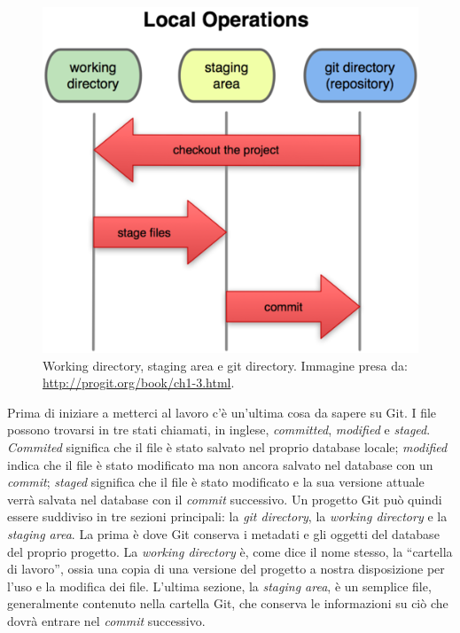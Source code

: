 \documentclass[a4paper,12pt,oneside]{article}
\begin{document}
\begin{figure}
  \centering
  \includegraphics{18333fig0106-tn}
  \caption{Working directory, staging area e git directory. Immagine presa da:
    \url{http://progit.org/book/ch1-3.html}.}
\end{figure}
Prima di iniziare a metterci al lavoro c'è un'ultima cosa da sapere su Git. I
file possono trovarsi in tre stati chiamati, in inglese, \emph{committed},
\emph{modified} e \emph{staged}. \emph{Commited} significa che il file è stato
salvato nel proprio database locale; \emph{modified} indica che il file è stato
modificato ma non ancora salvato nel database con un \emph{commit};
\emph{staged} significa che il file è stato modificato e la sua versione attuale
verrà salvata nel database con il \emph{commit} successivo.
Un progetto Git può quindi essere suddiviso in tre sezioni principali: la
\emph{git directory}, la \emph{working directory} e la \emph{staging area}. La
prima è dove Git conserva i metadati e gli oggetti del database del proprio
progetto. La \emph{working directory} è, come dice il nome stesso, la ``cartella
di lavoro'', ossia una copia di una versione del progetto a nostra disposizione
per l'uso e la modifica dei file. L'ultima sezione, la \emph{staging area}, è un
semplice file, generalmente contenuto nella cartella Git, che conserva le
informazioni su ciò che dovrà entrare nel \emph{commit} successivo.
\end{document}

